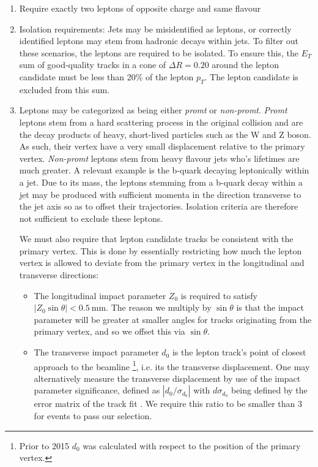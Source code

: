 \documentclass{article}
\begin{document}
\begin{titlepage}
\begin{enumerate}
    \item Require exactly two leptons of opposite charge and same flavour
    
    \item Isolation requirements:  Jets may be misidentified as leptons, or correctly identified leptons may stem from hadronic decays within jets. To filter out these scenarios, the leptons are required to be isolated. To ensure this, the $E_T$ sum of good-quality tracks in a cone of $\Delta R = 0.20$ around the lepton candidate must be less than 20\% of the lepton $p_T$. The lepton candidate is excluded from this sum. 
    
   \item Leptons may be categorized as being either \textit{promt} or \textit{non-promt}. \textit{Promt} leptons stem from a hard scattering process in the original collision and are the decay products of heavy, short-lived particles such as the W and Z boson. As such, their vertex have a very small displacement relative to the primary vertex. \textit{Non-promt} leptons stem from heavy flavour jets who's lifetimes are much greater. A relevant example is the b-quark decaying leptonically within a jet. Due to its mass, the leptons stemming from a b-quark decay within a jet may be produced with sufficient momenta in the direction transverse to the jet axis so as to offset their trajectories. Isolation criteria are therefore not sufficient to exclude these leptons. 
   
   We must also require that lepton candidate tracks be consistent with the primary vertex. This is done by essentially restricting how much the lepton vertex is allowed to deviate from the primary vertex in the longitudinal and transverse directions: 
  
    \begin{itemize}
     \item   The longitudinal impact parameter $Z_0$ is required to satisfy $|Z_0 \sin \theta| < \SI{0.5}{\milli \meter}$. The reason we multiply by $\sin \theta$ is that the impact parameter will be greater at smaller angles for tracks originating from the primary vertex, and so we offset this via $\sin \theta$. 
     \item    The transverse impact parameter $d_0$ is the lepton track's point of closest approach to the beamline \footnote{Prior to 2015 $d_0$ was calculated with respect to the position of the primary vertex.}, i.e. its the transverse displacement. One may alternatively measure the transverse displacement by use of the impact parameter significance, defined as $|d_0/\sigma_{d_0}|$ with $d\sigma_{d_0}$ being defined by the error matrix of the track fit\cite{Brendlinger} . We require this ratio to be smaller than 3 for events to pass our selection.
   \end{itemize}
   

\end{enumerate}
\end{titlepage}
\end{document}
